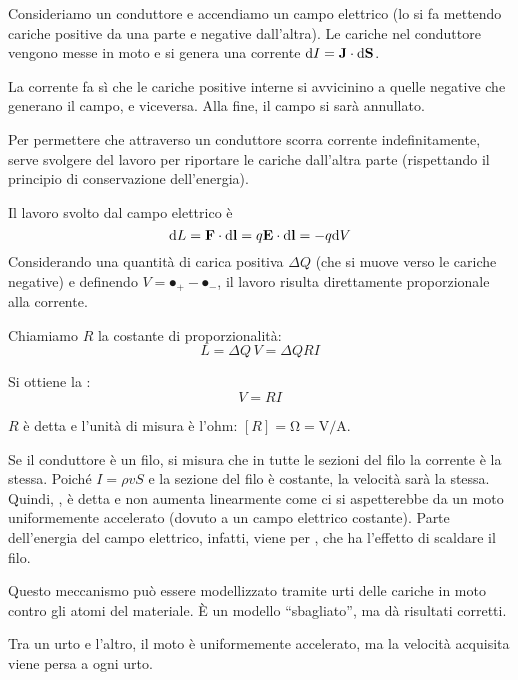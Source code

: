 Consideriamo un conduttore e accendiamo un campo elettrico (lo si fa mettendo cariche positive da una parte e negative dall'altra).
Le cariche nel conduttore vengono messe in moto e si genera una corrente $\mathrm{d} I = \mathbf{J} \cdot \mathrm{d} \mathbf{S}$.

La corrente fa sì che le cariche positive interne si avvicinino a quelle negative che generano il campo, e viceversa.
Alla fine, il campo si sarà annullato.

Per permettere che attraverso un conduttore scorra corrente indefinitamente, serve svolgere del lavoro per riportare le cariche dall'altra parte (rispettando il principio di conservazione dell'energia).

Il lavoro svolto dal campo elettrico è
\begin{equation}
    \mathrm{d} L = \mathbf{F} \cdot \mathrm{d} \mathbf{l} = q \mathbf{E} \cdot \mathrm{d} \mathbf{l} = - q \mathrm{d} V
\end{equation}
Considerando una quantità di carica positiva $\Delta Q$ (che si muove verso le cariche negative) e definendo $V = \spot_+ - \spot_-$, il lavoro risulta direttamente proporzionale alla corrente.

Chiamiamo $R$ la costante di proporzionalità:
\begin{equation}
    L = \Delta Q \, V = \Delta Q  R I
\end{equation}

Si ottiene la :
\begin{equation}
    V = R I
\end{equation}

$R$ è detta  e l'unità di misura è l'ohm: $[R] = \unit{\ohm} = \unit{\volt\per\ampere}$.

Se il conduttore è un filo, si misura che in tutte le sezioni del filo la corrente è la stessa.
Poiché $I = \rho v S$ e la sezione del filo è costante, la velocità sarà la stessa.
Quindi, , è detta  e non aumenta linearmente come ci si aspetterebbe da un moto uniformemente accelerato (dovuto a un campo elettrico costante).
Parte dell'energia del campo elettrico, infatti, viene  per , che ha l'effetto di scaldare il filo.

Questo meccanismo può essere modellizzato tramite urti delle cariche in moto contro gli atomi del materiale.
È un modello ``sbagliato'', ma dà risultati corretti.

Tra un urto e l'altro, il moto è uniformemente accelerato, ma la velocità acquisita viene persa a ogni urto.

